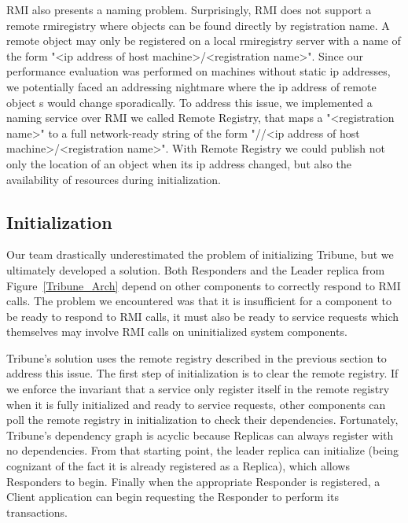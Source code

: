 \documentclass[10pt,twocolumn]{article}
\begin{document}
RMI also presents a naming problem. Surprisingly, RMI does not support a remote rmiregistry where objects can be found directly by registration name. A remote object may only be registered on a local rmiregistry server with a name of the form "\textless{}ip address of host machine\textgreater{}/\textless{}registration name\textgreater{}".  Since our performance evaluation was performed on machines without static ip addresses, we potentially faced an addressing nightmare where the ip address of remote object s would change sporadically. To address this issue, we implemented a naming service over RMI we called Remote Registry, that maps a "\textless{}registration name\textgreater{}" to a full network-ready string of the form "//\textless{}ip address of host machine\textgreater{}/\textless{}registration name\textgreater{}". With Remote Registry we could publish not only the location of an object when its ip address changed, but also the availability of resources during initialization.

\subsection{Initialization}
Our team drastically underestimated the problem of initializing Tribune, but we ultimately developed a solution. Both Responders and the Leader replica from Figure~\ref{Tribune_Arch} depend on other components to correctly respond to RMI calls. The problem we encountered was that it is insufficient for a component to be ready to respond to RMI calls, it must also be ready to service requests which themselves may involve RMI calls on uninitialized system components.

Tribune's solution uses the remote registry described in the previous section to address this issue. The first step of initialization is to clear the remote registry. If we enforce the invariant that a service only register itself in the remote registry when it is fully initialized and ready to service requests, other components can poll the remote registry in initialization to check their dependencies. Fortunately, Tribune's dependency graph is acyclic because Replicas can always register with no dependencies. From that starting point, the leader replica can initialize (being cognizant of the fact it is already registered as a Replica), which allows Responders to begin. Finally when the appropriate Responder is registered, a Client application can begin requesting the Responder to perform its transactions.
\end{document}

